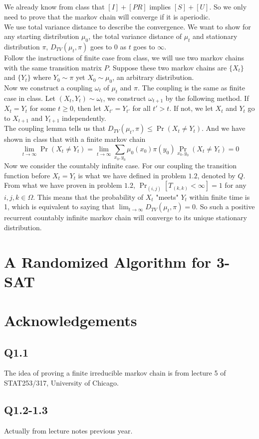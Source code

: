 \documentclass[12pt,letterpaper]{article}
\begin{document}
\subsection{}
We already know from class that $[I]+[PR]$ implies $[S]+[U]$.
So we only need to prove that the markov chain will converge if it is aperiodic.\\
We use total variance distance to describe the convergence. 
We want to show for any starting distribution $\mu_0$, 
the total variance distance of $\mu_t$ and stationary distribution $\pi$, $D_{TV}(\mu_t,\pi)$
goes to $0$ as $t$ goes to $\infty$.\\
Follow the instructions of finite case from class, 
we will use two markov chains with the same transition matrix $P$.
Suppose these two markov chains are $\{X_t\}$ and $\{Y_t\}$ where $Y_0\sim\pi$ yet $X_0\sim\mu_0$, an arbitrary distribution.\\
Now we construct a coupling $\omega_t$ of $\mu_t$ and $\pi$.
The coupling is the same as finite case in class.
Let $(X_t,Y_t)\sim\omega_t$, we construct $\omega_{t+1}$ by the following method.
If $X_t=Y_t$ for some $t\geq 0$, then let $X_{t'}=Y_{t'}$ for all $t'>t$. 
If not, we let $X_t$ and $Y_t$ go to $X_{t+1}$ and $Y_{t+1}$ independently.\\
The coupling lemma tells us that $D_{TV}(\mu_t,\pi)\leq\Pr(X_t\neq Y_t)$. 
And we have shown in class that with a finite markov chain 
$$\lim_{t\to\infty}\Pr(X_t\neq Y_t)=\lim_{t\to\infty}\sum_{x_{0},y_{0}}\mu_{0}(x_0)\pi(y_0)\Pr_{x_0,y_0}(X_t\neq Y_t)=0$$
Now we consider the countably infinite case. For our coupling the transition function before $X_t=Y_t$ is what we have defined in problem $1.2$, denoted by $Q$.
From what we have proven in problem $1.2$, $\Pr_{(i,j)}[T_{(k,k)}<\infty]=1$ for any $i,j,k\in\Omega$.
This means that the probability of $X_t$ "meets" $Y_t$ within finite time is 1,
which is equivalent to saying that $\lim_{t\to\infty}D_{TV}(\mu_t,\pi)=0$.
So such a positive recurrent countably infinite markov chain will converge to its unique stationary distribution.


\newpage
\section{A Randomized Algorithm for 3-SAT}
\subsection{}

\newpage
\section{Acknowledgements}
\subsection*{Q1.1}
The idea of proving a finite irreducible markov chain is from lecture 5 of STAT253/317, University of Chicago.
\subsection*{Q1.2-1.3}
Actually from lecture notes previous year.
\end{document}
